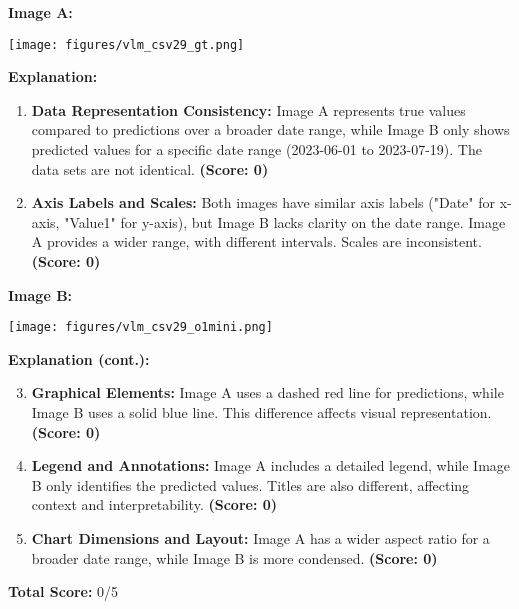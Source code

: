 \onecolumn
\begin{tcolorbox}[colback=blue!5!white, colframe=blue!75!black, title=Example \#3 of VLM-as-a-judge (Model: o1-mini), width=\textwidth]
\begin{minipage}[t]{\columnwidth}
\textbf{Image A:}
\begin{center}
    \texttt{[image: figures/vlm\_csv29\_gt.png]}
\end{center}
\textbf{Explanation:}
\begin{enumerate}[leftmargin=*]
    \item \textbf{Data Representation Consistency:}  
    Image A represents true values compared to predictions over a broader date range, while Image B only shows predicted values for a specific date range (2023-06-01 to 2023-07-19). The data sets are not identical. \textbf{(Score: 0)}
    
    \item \textbf{Axis Labels and Scales:}  
    Both images have similar axis labels ("Date" for x-axis, "Value1" for y-axis), but Image B lacks clarity on the date range. Image A provides a wider range, with different intervals. Scales are inconsistent. \textbf{(Score: 0)}
\end{enumerate}
\end{minipage}

\begin{minipage}[t]{\columnwidth}
\textbf{Image B:}
\begin{center}
    \texttt{[image: figures/vlm\_csv29\_o1mini.png]}
\end{center}
\textbf{Explanation (cont.):}
\begin{enumerate}[leftmargin=*]
    \setcounter{enumi}{2} %
    \item \textbf{Graphical Elements:}  
    Image A uses a dashed red line for predictions, while Image B uses a solid blue line. This difference affects visual representation. \textbf{(Score: 0)}
    
    \item \textbf{Legend and Annotations:}  
    Image A includes a detailed legend, while Image B only identifies the predicted values. Titles are also different, affecting context and interpretability. \textbf{(Score: 0)}
    
    \item \textbf{Chart Dimensions and Layout:}  
    Image A has a wider aspect ratio for a broader date range, while Image B is more condensed. \textbf{(Score: 0)}
\end{enumerate}

\textbf{Total Score:} 0/5
\end{minipage}
\end{tcolorbox}
\twocolumn